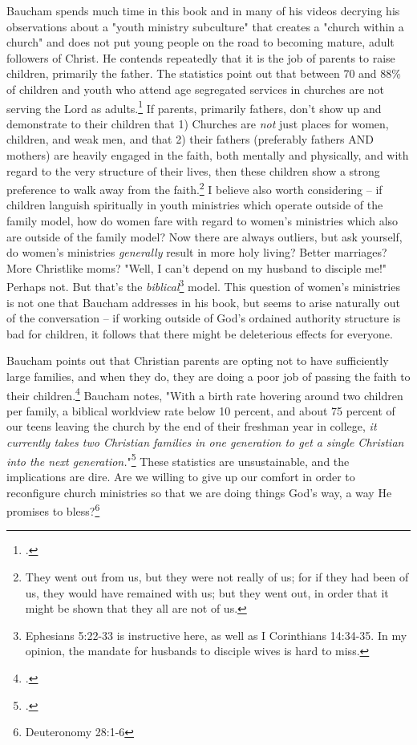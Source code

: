 Baucham spends much time in this book and in many of his videos decrying his observations about a "youth ministry subculture" that creates a "church within a church" and does not put young people on the road to becoming mature, adult followers of Christ.  He contends repeatedly that it is the job of parents to raise children, primarily the father.  The statistics point out that between 70 and 88\% of children and youth who attend age segregated services in churches are not serving the Lord as adults.\footcite[p. 10]{bauchamdriven}  If parents, primarily fathers, don't show up and demonstrate to their children that 1) Churches are \textit{not} just places for women, children, and weak men, and that 2) their fathers (preferably fathers AND mothers) are heavily engaged in the faith, both mentally and physically, and with regard to the very structure of their lives, then these children show a strong preference to walk away from the faith.\footnote{They went out from us, but they were not really of us; for if they had been of us, they would have remained with us; but they went out, in order that it might be shown that they all are not of us. } I believe also worth considering -- if children languish spiritually in youth ministries which operate outside of the family model, how do women fare with regard to women's ministries which also are outside of the family model?  Now there are always outliers, but ask yourself, do women's ministries \textit{generally} result in more holy living?  Better marriages?  More Christlike moms?  "Well, I can't depend on my husband to disciple me!"  Perhaps not.  But that's the \textit{biblical}\footnote{Ephesians 5:22-33 is instructive here, as well as I Corinthians 14:34-35.  In my opinion, the mandate for husbands to disciple wives is hard to miss.}  model.  This question of women's ministries is not one that Baucham addresses in his book, but seems to arise naturally out of the conversation -- if working outside of God's ordained authority structure is bad for children, it follows that there might be deleterious effects for everyone.  

Baucham points out that Christian parents are opting not to have sufficiently large families, and when they do, they are doing a poor job of passing the faith to their children.\footcite[p. 174]{bauchamdriven}  Baucham notes, "With a birth rate hovering around two children per family, a biblical worldview rate below 10 percent, and about 75 percent of our teens leaving the church by the end of their freshman year in college, \textit{it currently takes two Christian families in one generation to get a single Christian into the next generation.}"\footcite[p. 174, emphasis mine.]{bauchamdriven}  These statistics are unsustainable, and the implications are dire.  Are we willing to give up our comfort in order to reconfigure church ministries so that we are doing things God's way, a way He promises to bless?\footnote{Deuteronomy 28:1-6}

